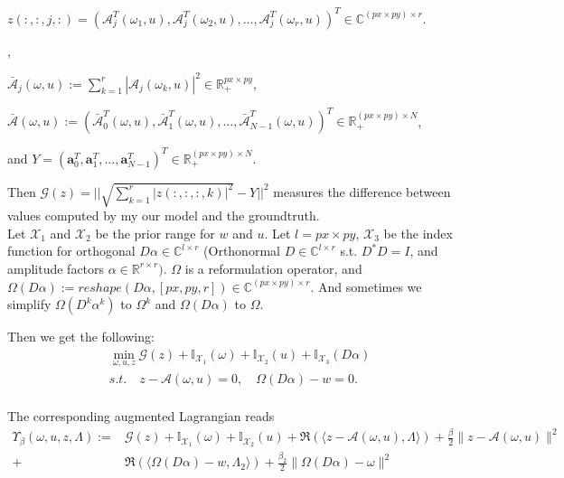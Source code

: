 \documentclass{article}
\numberwithin{equation}{section}
\begin{document}
$z(:,:,j,:) =\left(\mathcal{A}_{j}^{T}(\omega_1, u), \mathcal{A}_{j}^{T}(\omega_2, u), \ldots, \mathcal{A}_{j}^{T}(\omega_r, u)\right)^{T} 
\in \mathbb{C}^{(px\times py) \times r}$.


,

$\bar{\mathcal{A}}_{j}(\omega, u):= \sum_{k=1}^r |\mathcal{A}_{j}(\omega_k, u)|^2 \in \mathbb{R}_+^{px\times py}$,

 $\bar{\mathcal{A}}(\omega, u):=\left(\bar{\mathcal{A}}_{0}^{T}(\omega, u), \bar{\mathcal{A}}_{1}^{T}(\omega, u), \ldots,\bar{\mathcal{A}}_{N-1}^{T}(\omega, u)\right)^{T} 
\in \mathbb{R}_+^{(px\times py) \times N}$,
 

 
and $Y=\left(\boldsymbol{a}_{0}^{T}, \boldsymbol{a}_{1}^{T}, \ldots, \boldsymbol{a}_{N-1}^{T}\right)^{T} \in \mathbb{R}_{+}^{(px \times py) \times N }$.




 Then $\mathcal{G}(z)= || \sqrt{ \sum_{k=1}^{r} |z(:,:,:,k)|^2} - Y||^2$ measures the difference between values computed by my our model and the groundtruth. \\
 Let $\mathcal{X}_{1}$ and $\mathcal{X}_{2}$ be the prior range for $w$ and $u$. Let  $l=px \times py$, $\mathcal{X}_{3}$ be the index function for orthogonal $D\alpha \in \mathbb{C}^{l \times r}$ (Orthonormal $D \in  \mathbb{C}^{l \times r}$ s.t. $D^*D=I$, and amplitude factors $\alpha \in  \mathbb{R}^{r \times r})$.
 $\Omega$ is a reformulation operator, and $\Omega(D\alpha) := reshape(D\alpha,[px,py,r]) \in \mathbb{C}^{(px \times py) \times r}$. And sometimes we simplify $\Omega(D^k\alpha^k)$ to $\Omega^k$ and $\Omega(D\alpha)$ to $\Omega$.
 
  Then we get the following:
\begin{equation}
\begin{aligned}
&\min _{\omega, u, z} \mathcal{G}(z)+\mathbb{I}_{\mathcal{X}_{1}}(\omega)+\mathbb{I}_{\mathcal{X}_{2}}(u)
+ \mathbb{I}_{\mathcal{X}_{3}}(D\alpha) \\
 &s.t. \quad z-\mathcal{A}(\omega, u)=0, \quad \Omega(D\alpha) - w = 0. \\
\end{aligned}
\end{equation}

The corresponding augmented Lagrangian reads
$$
\begin{aligned}
\Upsilon_{\beta}(\omega, u, z, \Lambda):=&\mathcal{G}(z)+\mathbb{I}_{\mathcal{X}_{1}}(\omega)+\mathbb{I}_{\mathcal{X}_{2}}(u)+\Re(\langle z-\mathcal{A}(\omega, u), \Lambda\rangle)+\frac{\beta}{2}\|z-\mathcal{A}(\omega, u)\|^{2}
\\
+&\Re(\langle \Omega(D\alpha) - w, \Lambda_2\rangle)+\frac{\beta_2}{2}\| \Omega(D\alpha) - \omega\|^{2}
\end{aligned}
$$
\end{document}

